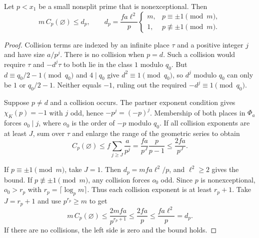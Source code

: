 \begin{lemma}
\label{lem:a-nonexceptional-collision}
\emitthmsource
Let $p<x_1$ be a small nonsplit prime that is nonexceptional. Then
\[
 m\,C_p(\varnothing)\le d_p,\qquad
 d_p=\frac{fa\ell^2}{p}
 \begin{cases}
  m,&p\equiv\pm1\pmod m,\\
  1,&p\not\equiv\pm1\pmod m.
 \end{cases}
\]
\end{lemma}
\begin{proof}
Collision terms are indexed by an infinite place $\tau$ and a positive integer $j$ and have size $a/p^j$. There is no collision when $p=d$. Such a collision would require $\tau$ and $-d^j\tau$ to both lie in the class $1$ modulo $q_0$. But $d\equiv q_0/2-1\pmod{q_0}$ and $4\mid q_0$ give $d^2\equiv1\pmod{q_0}$, so $d^j$ modulo $q_0$ can only be $1$ or $q_0/2-1$. Neither equals $-1$, ruling out the required $-d^j\equiv1\pmod{q_0}$.

Suppose $p\ne d$ and a collision occurs. The partner exponent condition gives $\chi_K(p)=-1$ with $j$ odd, hence $-p^j=(-p)^j$. Membership of both places in $\Phi_a$ forces $o_0\mid j$, where $o_0$ is the order of $-p$ modulo $q_0$. If all collision exponents are at least $J$, sum over $\tau$ and enlarge the range of the geometric series to obtain
\[
 C_p(\varnothing)
 \le f\sum_{j\ge J}\frac{a}{p^j}
 =\frac{fa}{p^J}\frac{p}{p-1}
 \le\frac{2fa}{p^J}.
\]

If $p\equiv\pm1\pmod m$, take $J=1$. Then $d_p=mfa\ell^2/p$, and $\ell^2\ge2$ gives the bound. If $p\not\equiv\pm1\pmod m$, any collision forces $o_0$ odd. Since $p$ is nonexceptional, $o_0>r_p$ with $r_p=\lceil\log_p m\rceil$. Thus each collision exponent is at least $r_p+1$. Take $J=r_p+1$ and use $p^{r_p}\ge m$ to get
\[
 m\,C_p(\varnothing)
 \le \frac{2mfa}{p^{r_p+1}}
 \le \frac{2fa}{p}
 \le \frac{fa\ell^2}{p}=d_p.
\]
If there are no collisions, the left side is zero and the bound holds.
\end{proof}

